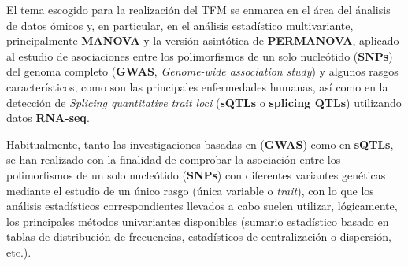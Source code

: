 \documentclass[IB,BIB]{TFUOC}%
\begin{document}
%
%
%
%
%
%
%


El tema escogido para la realización del TFM se enmarca en el área del ánalisis de datos ómicos y, en particular, en el análisis estadístico multivariante, principalmente \textbf{MANOVA} y la versión asintótica de \textbf{PERMANOVA}, aplicado al estudio de asociaciones entre los polimorfismos de un solo nucleótido (\textbf{SNPs}) del genoma completo (\textbf{GWAS}, \textit{Genome-wide association study}) y algunos rasgos característicos, como son las principales enfermedades humanas, así como en la detección de \textit{Splicing quantitative trait loci} (\textbf{sQTLs} o \textbf{splicing QTLs}) utilizando datos \textbf{RNA-seq}.


Habitualmente, tanto las investigaciones basadas en (\textbf{GWAS}) como en \textbf{sQTLs}, se han realizado con la finalidad de comprobar la asociación entre los polimorfismos de un solo nucleótido (\textbf{SNPs}) con diferentes variantes genéticas mediante el estudio de un único rasgo (única variable o \textit{trait}), con lo que los análisis estadísticos correspondientes llevados a cabo suelen utilizar, lógicamente, los principales métodos univariantes disponibles (sumario estadístico basado en tablas de distribución de frecuencias, estadísticos de centralización o dispersión, etc.).
\end{document}
